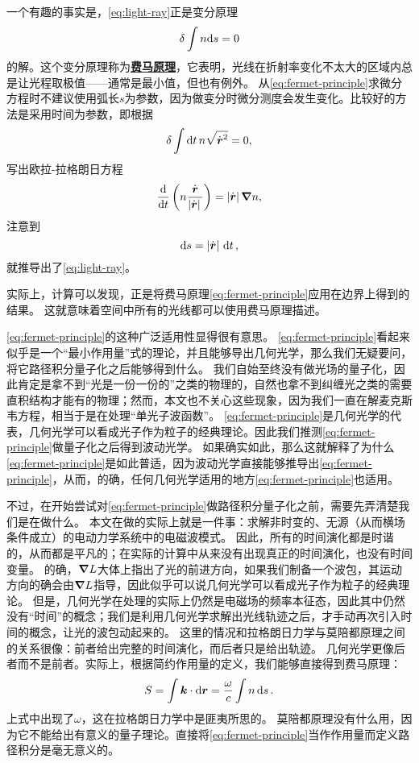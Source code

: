 \documentclass[UTF8, a4paper]{ctexart}
\newcommand*{\concept}[1]{\underline{\textbf{#1}}}
\begin{document}
一个有趣的事实是，\eqref{eq:light-ray}正是变分原理
\begin{equation}
    \var \int n \dd s = 0
    \label{eq:fermet-principle}
\end{equation}
的解。这个变分原理称为\concept{费马原理}，它表明，光线在折射率变化不太大的区域内总是让光程取极值——通常是最小值，但也有例外。
从\eqref{eq:fermet-principle}求微分方程时不建议使用弧长$s$为参数，因为做变分时微分测度会发生变化。比较好的方法是采用时间为参数，即根据
\[
    \var \int \dd{t} n \sqrt{\dot{\vb*{r}}^2} = 0,
\]
写出欧拉-拉格朗日方程
\[
    \dv{t}\left( n \frac{\dot{\vb*{r}}}{\abs*{\dot{\vb*{r}}}} \right) = \abs*{\dot{\vb*{r}}} \grad{n},
\]
注意到
\[
    \dd{s} = \abs*{\dot{\vb*{r}}} \dd{t},
\]
就推导出了\eqref{eq:light-ray}。

实际上，计算可以发现，正是将费马原理\eqref{eq:fermet-principle}应用在边界上得到的结果。
这就意味着空间中所有的光线都可以使用费马原理描述。

\eqref{eq:fermet-principle}的这种广泛适用性显得很有意思。
\eqref{eq:fermet-principle}看起来似乎是一个“最小作用量”式的理论，并且能够导出几何光学，那么我们无疑要问，将它路径积分量子化之后能够得到什么。
我们自始至终没有做光场的量子化，因此肯定是拿不到“光是一份一份的”之类的物理的，自然也拿不到纠缠光之类的需要直积结构才能有的物理；然而，本文也不关心这些现象，因为我们一直在解麦克斯韦方程，相当于是在处理“单光子波函数”。
\eqref{eq:fermet-principle}是几何光学的代表，几何光学可以看成光子作为粒子的经典理论。因此我们推测\eqref{eq:fermet-principle}做量子化之后得到波动光学。
如果确实如此，那么这就解释了为什么\eqref{eq:fermet-principle}是如此普适，因为波动光学直接能够推导出\eqref{eq:fermet-principle}，从而，的确，任何几何光学适用的地方\eqref{eq:fermet-principle}也适用。

不过，在开始尝试对\eqref{eq:fermet-principle}做路径积分量子化之前，需要先弄清楚我们是在做什么。
本文在做的实际上就是一件事：求解非时变的、无源（从而横场条件成立）的电动力学系统中的电磁波模式。
因此，所有的时间演化都是时谐的，从而都是平凡的；在实际的计算中从来没有出现真正的时间演化，也没有时间变量。
的确，$\grad{L}$大体上指出了光的前进方向，如果我们制备一个波包，其运动方向的确会由$\grad{L}$指导，因此似乎可以说几何光学可以看成光子作为粒子的经典理论。
但是，几何光学在处理的实际上仍然是电磁场的频率本征态，因此其中仍然没有“时间”的概念；我们是利用几何光学求解出光线轨迹之后，才手动再次引入时间的概念，让光的波包动起来的。
这里的情况和拉格朗日力学与莫陪都原理之间的关系很像：前者给出完整的时间演化，而后者只是给出轨迹。
几何光学更像后者而不是前者。实际上，根据简约作用量的定义，我们能够直接得到费马原理：
\begin{equation}
    S = \int \vb*{k} \cdot \dd{\vb*{r}} = \frac{\omega}{c} \int n \dd{s}.
    \label{eq:abbr-action-ray}
\end{equation}
上式中出现了$\omega$，这在拉格朗日力学中是匪夷所思的。
莫陪都原理没有什么用，因为它不能给出有意义的量子理论。直接将\eqref{eq:fermet-principle}当作作用量而定义路径积分是毫无意义的。
\end{document}
